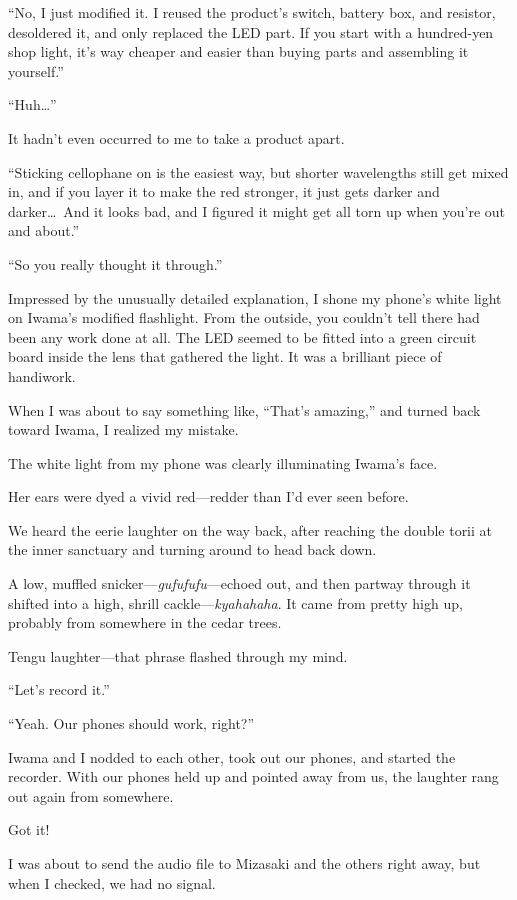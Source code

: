 \documentclass[
    a4paper,
    12pt,
    twoside,
    openany,
    UTF8,
    fontset=windows
]{ctexbook}
\begin{document}
``No, I just modified it. I reused the product's switch, battery box, and resistor, desoldered it, and only replaced the LED part. If you start with a hundred-yen shop light, it's way cheaper and easier than buying parts and assembling it yourself.''

``Huh\dots''

It hadn't even occurred to me to take a product apart.

``Sticking cellophane on is the easiest way, but shorter wavelengths still get mixed in, and if you layer it to make the red stronger, it just gets darker and darker\dots\ And it looks bad, and I figured it might get all torn up when you're out and about.''

``So you really thought it through.''

Impressed by the unusually detailed explanation, I shone my phone's white light on Iwama's modified flashlight. From the outside, you couldn't tell there had been any work done at all. The LED seemed to be fitted into a green circuit board inside the lens that gathered the light. It was a brilliant piece of handiwork.

When I was about to say something like, ``That's amazing,'' and turned back toward Iwama, I realized my mistake.

The white light from my phone was clearly illuminating Iwama's face.

Her ears were dyed a vivid red---redder than I'd ever seen before.

We heard the eerie laughter on the way back, after reaching the double torii at the inner sanctuary and turning around to head back down.

A low, muffled snicker---\textit{gufufufu}---echoed out, and then partway through it shifted into a high, shrill cackle---\textit{kyahahaha}. It came from pretty high up, probably from somewhere in the cedar trees.

Tengu laughter---that phrase flashed through my mind.

``Let's record it.''

``Yeah. Our phones should work, right?''

Iwama and I nodded to each other, took out our phones, and started the recorder. With our phones held up and pointed away from us, the laughter rang out again from somewhere.

Got it!

I was about to send the audio file to Mizasaki and the others right away, but when I checked, we had no signal.
\end{document}
